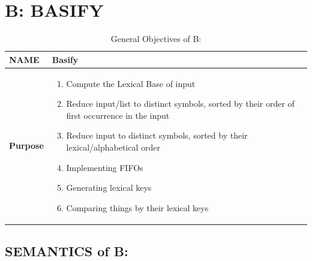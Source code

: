 \documentclass[a4paper, 18pt]{book} %
\begin{document}
\chapter{B: BASIFY}
\label{SECB}


\begin{table}[H]
  \centering
  \LARGE
	\begin{tabular}[t]{|p{}|p{}}
 
	\textbf{NAME} & Basify\\
	\hline
	\textbf{Purpose} & \begin{enumerate}
	\item Compute the Lexical Base of input
	\item Reduce input/list to distinct symbols, sorted by their order of first occurrence in the input
	\item Reduce input to distinct symbols, sorted by their lexical/alphabetical order
	\item Implementing FIFOs
	\item Generating lexical keys
	\item Comparing things by their lexical keys
	\end{enumerate}\\
	\hline
	              
\end{tabular}
\caption{General Objectives of B:}
  \label{TABTAZB}
\end{table}


\section{SEMANTICS of B:}
\label{SECSEMB}
\end{document}
